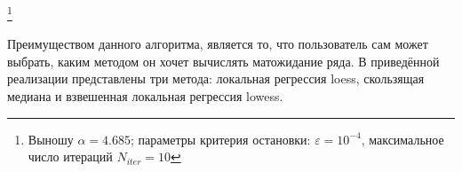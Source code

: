 \documentclass[specialist,
               substylefile = spbu.rtx,
               subf,href,colorlinks=true, 12pt]{disser}
\newtheorem*{notice*}{Замечание}
\begin{document}
\footnote{Выношу $\alpha = 4.685$; параметры критерия остановки: $\varepsilon = 10^{-4}$, максимальное число итераций $N_{iter} = 10$}

\normalsize{Преимуществом данного алгоритма, является то, что пользователь сам может выбрать, каким методом он хочет вычислять матожидание ряда. В приведённой реализации представлены три метода: локальная регрессия loess, скользящая медиана и взвешенная локальная регрессия lowess.}

%
%
%
%
%
%
\end{document}
